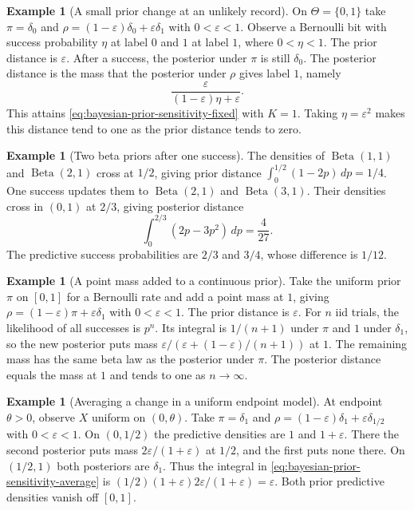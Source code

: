 \documentclass[11pt,oneside]{book}
\theoremstyle{definition}
\newtheorem{example}[theorem]{Example}
\theoremstyle{remark}
\begin{document}
\begin{example}[A small prior change at an unlikely record]
\label{ex:bayesian-sensitivity-rare-record}
On $\Theta=\{0,1\}$ take $\pi=\delta_0$ and
$\rho=(1-\varepsilon)\delta_0+\varepsilon\delta_1$ with
$0<\varepsilon<1$. Observe a Bernoulli bit with success
probability $\eta$ at label $0$ and $1$ at label $1$, where
$0<\eta<1$. The prior distance is $\varepsilon$.
After a success, the posterior under $\pi$ is still
$\delta_0$. The posterior distance is the mass that the
posterior under $\rho$ gives label $1$, namely
\[
\frac{\varepsilon}{(1-\varepsilon)\eta+\varepsilon}.
\]
This attains \eqref{eq:bayesian-prior-sensitivity-fixed} with
$K=1$. Taking $\eta=\varepsilon^2$ makes this distance tend to
one as the prior distance tends to zero.
\end{example}

\begin{example}[Two beta priors after one success]
\label{ex:bayesian-sensitivity-beta-priors}
The densities of $\operatorname{Beta}(1,1)$ and
$\operatorname{Beta}(2,1)$ cross at $1/2$, giving prior
distance $\int_0^{1/2}(1-2p)\,dp=1/4$.
One success updates them to $\operatorname{Beta}(2,1)$
and $\operatorname{Beta}(3,1)$. Their densities cross in
$(0,1)$ at $2/3$, giving posterior distance
\[
\int_0^{2/3}(2p-3p^2)\,dp=\frac{4}{27}.
\]
The predictive success probabilities are $2/3$ and $3/4$,
whose difference is $1/12$.
\end{example}

\begin{example}[A point mass added to a continuous prior]
\label{ex:bayesian-sensitivity-bernoulli-contamination}
Take the uniform prior $\pi$ on $[0,1]$ for a Bernoulli rate
and add a point mass at $1$, giving
$\rho=(1-\varepsilon)\pi+\varepsilon\delta_1$ with
$0<\varepsilon<1$. The prior distance is $\varepsilon$.
For $n$ iid trials, the likelihood of all successes is $p^n$.
Its integral is
$1/(n+1)$ under $\pi$ and $1$ under $\delta_1$, so the new
posterior puts mass
$\varepsilon/(\varepsilon+(1-\varepsilon)/(n+1))$ at $1$.
The remaining mass has the same beta law as the posterior
under $\pi$. The posterior distance equals the mass at $1$
and tends to one as $n\to\infty$.
\end{example}

\begin{example}[Averaging a change in a uniform endpoint model]
\label{ex:bayesian-sensitivity-endpoint-average}
At endpoint $\theta>0$, observe $X$ uniform on $(0,\theta)$.
Take $\pi=\delta_1$ and $\rho=(1-\varepsilon)\delta_1+
\varepsilon\delta_{1/2}$ with $0<\varepsilon<1$.
On $(0,1/2)$ the predictive densities are $1$ and
$1+\varepsilon$. There the second posterior puts mass
$2\varepsilon/(1+\varepsilon)$ at $1/2$, and the first puts
none there. On $(1/2,1)$ both posteriors are $\delta_1$.
Thus the integral in \eqref{eq:bayesian-prior-sensitivity-average}
is $(1/2)(1+\varepsilon)2\varepsilon/(1+\varepsilon)=\varepsilon$.
Both prior predictive densities vanish off $[0,1]$.
\end{example}
\end{document}
